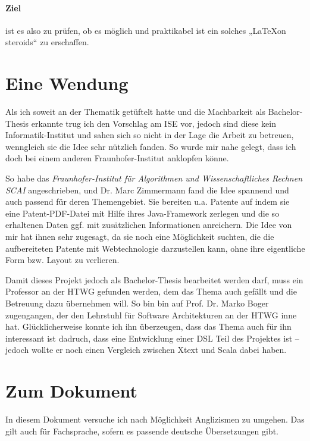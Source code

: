 \paragraph{Ziel} ist es also zu prüfen, ob es möglich und praktikabel ist
ein solches „\LaTeX on steroids“ zu erschaffen.

\section{Eine Wendung}

Als ich soweit an der Thematik getüftelt hatte und die Machbarkeit als
Bachelor-Thesis erkannte trug ich den Vorschlag am ISE vor, jedoch sind
diese kein Informatik-Institut und sahen sich so nicht in der Lage die Arbeit
zu betreuen, wenngleich sie die Idee sehr nützlich fanden. So wurde mir
nahe gelegt, dass ich doch bei einem anderen Fraunhofer-Institut anklopfen
könne.

So habe das \emph{Fraunhofer-Institut für Algorithmen und Wissenschaftliches
Rechnen SCAI} angeschrieben, und Dr. Marc Zimmermann fand
die Idee spannend und auch passend für deren Themengebiet. Sie bereiten u.a.
Patente auf indem sie eine Patent-PDF-Datei mit Hilfe ihres Java-Framework
zerlegen und die so erhaltenen Daten ggf. mit zusätzlichen Informationen
anreichern. Die Idee von mir hat ihnen sehr zugesagt, da sie noch eine
Möglichkeit suchten, die die aufbereiteten Patente mit Webtechnologie
darzustellen kann, ohne ihre eigentliche Form bzw. Layout zu verlieren.

Damit dieses Projekt jedoch als Bachelor-Thesis bearbeitet werden darf,
muss ein Professor an der HTWG gefunden werden, dem das Thema auch gefällt
und die Betreuung dazu übernehmen will. So bin bin auf Prof. Dr. Marko
Boger zugengangen, der den Lehrstuhl für Software Architekturen an der HTWG
inne hat. Glücklicherweise konnte ich ihn überzeugen, dass das Thema auch
für ihn interessant ist dadruch, dass eine Entwicklung einer DSL Teil des
Projektes ist -- jedoch wollte er noch einen Vergleich zwischen Xtext und Scala
dabei haben.

\section{Zum Dokument}

In diesem Dokument versuche ich nach Möglichkeit Anglizismen zu umgehen.
Das gilt auch für Fachsprache, sofern es passende deutsche Übersetzungen gibt.


